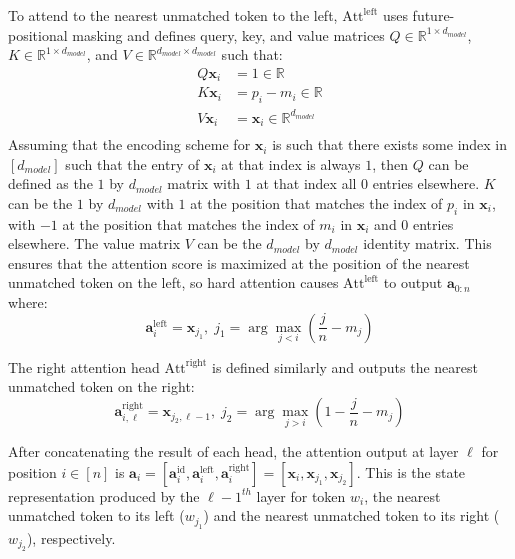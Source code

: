 To attend to the nearest unmatched token to the left, $\mathrm{Att}^{\mathrm{left}}$ uses future-positional masking and defines query, key, and value matrices $Q \in \mathbb{R}^{1 \times d_{model}}$, $K \in \mathbb{R}^{1 \times d_{model}}$, and $V \in \mathbb{R}^{d_{model} \times d_{model}}$ such that:\begin{align*}
    Q\mathbf{x}_{i} & = 1 \in \mathbb{R}\\
    K\mathbf{x}_{i} & = p_i - m_i \in \mathbb{R}\\
    V\mathbf{x}_i & = \mathbf{x}_i \in \mathbb{R}^{d_{model}}\\
\end{align*}
Assuming that the encoding scheme for $\mathbf{x}_i$ is such that there exists some index in $[d_{model}]$ such that the entry of $\mathbf{x}_{i}$ at that index is always $1$, then $Q$ can be defined as the $1$ by $d_{model}$ matrix with $1$ at that index all $0$ entries elsewhere.
$K$ can be the $1$ by $d_{model}$ with $1$ at the position that matches the index of $p_i$ in $\mathbf{x}_i$, with $-1$ at the position that matches the index of $m_i$ in $\mathbf{x}_i$ and $0$ entries elsewhere.
The value matrix $V$ can be the $d_{model}$ by $d_{model}$ identity matrix. This ensures that the attention score is maximized at the position of the nearest unmatched token on the left, so hard attention causes $\mathrm{Att}^{\mathrm{left}}$ to output $\mathbf{a}_{0:n}$ where:
$$\mathbf{a}_{i}^{\mathrm{left}} = \mathbf{x}_{j_1}, \; j_1 = \arg \max_{j<i}\left(\frac{j}{n} - m_{j}\right)$$

The right attention head $\mathrm{Att}^{\mathrm{right}}$ is defined similarly and outputs the nearest unmatched token on the right:
$$\mathbf{a}_{i,\ell}^{\mathrm{right}} =  \mathbf{x}_{j_2,\ell-1}, \; j_2 = \arg \max_{j>i}\left(1 - \frac{j}{n} - m_{j}\right)$$

After concatenating the result of each head, the attention output at layer $\ell$ for position $i \in [n]$ is $\mathbf{a}_{i} = [\mathbf{a}_{i}^{\mathrm{id}}, \mathbf{a}_{i}^{\mathrm{left}}, \mathbf{a}_{i}^{\mathrm{right}}] = [\mathbf{x}_{i}, \mathbf{x}_{j_1}, \mathbf{x}_{j_2}]$. This is the state representation produced by the $\ell-1^{\mathit{th}}$ layer for token $w_i$, the nearest unmatched token to its left ($w_{j_1}$) and the nearest unmatched token to its right ($w_{j_2}$), respectively.

